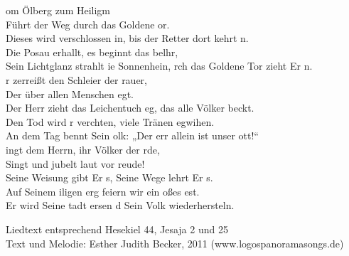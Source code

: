 
om Ölberg zum Heiligm\\ 
Führt der Weg durch das Goldene or.\\
Dieses wird verschlossen in, bis der Retter dort kehrt n.\\
Die Posau erhallt, es beginnt das belhr,\\
Sein Lichtglanz strahlt ie Sonnenhein, rch das Goldene Tor zieht Er n.\\

r zerreißt den Schleier der rauer,\\
Der über allen Menschen egt.\\
Der Herr zieht das Leichentuch eg, das alle Völker beckt.\\
Den Tod wird r verchten, viele Tränen egwihen.\\
An dem Tag bennt Sein olk: „Der err allein ist unser ott!“\\

ingt dem Herrn, ihr Völker der rde,\\
Singt und jubelt laut vor reude!\\
Seine Weisung gibt Er s, Seine Wege lehrt Er s.\\
Auf Seinem iligen erg feiern wir ein oßes est.\\
Er wird Seine tadt ersen d Sein Volk wiederhersteln.\\

\begin{footnotesize}
Liedtext entsprechend Hesekiel 44, Jesaja 2 und 25\\
Text und Melodie: Esther Judith Becker, 2011 (www.logospanoramasongs.de)
\end{footnotesize}
